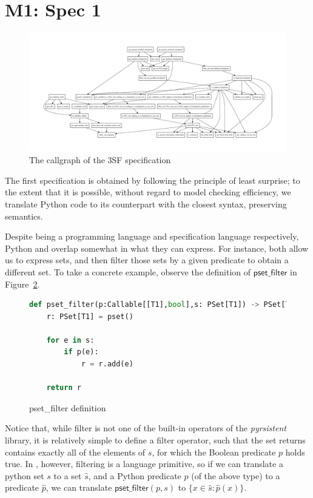 
\section{M1: Spec 1}

\begin{figure}
    \centering
    \includegraphics[width=\textwidth,angle=-90]{ffg-callgraph.pdf}
    \caption{The callgraph of the 3SF specification}
    \label{fig:your_label}
\end{figure}

The first specification is obtained by following the principle of least surprise; to the extent that it is possible, without regard to model checking efficiency, we translate Python code to its \tlap{} counterpart with the closest syntax, preserving semantics.

Despite being a programming language and specification language respectively, Python and \tlap{} overlap somewhat in what they can express. 
For instance, both allow us to express sets, and then filter those sets by a given predicate to obtain a different set.
To take a concrete example, observe the definition of $\mathsf{pset\_filter}$ in Figure~\ref{py_filter}.
\begin{figure}
\begin{lstlisting}[language=Python]
def pset_filter(p:Callable[[T1],bool],s: PSet[T1]) -> PSet[T1]:
    r: PSet[T1] = pset()

    for e in s:
        if p(e):
            r = r.add(e)

    return r
\end{lstlisting}
\caption{\textsf{pset\_filter} definition \label{py_filter}}
\end{figure}
%
Notice that, while filter is not one of the built-in operators of the \emph{pyrsistent} library, it is relatively simple to define a filter operator, such that the set returns contains exactly all of the elements of $s$, for which the Boolean predicate $p$ holds true.
In \tlap{}, however, filtering is a language primitive, so if we can translate a python set $s$ to a \tlap{} set $\hat{s}$, and a Python predicate $p$ (of the above type) to a \tlap{} predicate $\hat{p}$, we can translate $\mathsf{pset\_filter}(p, s)$ to $\{ x \in \hat{s}\colon \hat{p}(x) \}$.


